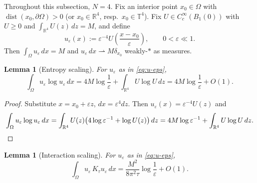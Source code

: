 \documentclass[11pt,reqno]{amsart}
\newtheorem{lemma}[theorem]{Lemma}
\theoremstyle{definition}
\theoremstyle{remark}
\newcommand{\R}{\mathbb{R}}
\newcommand{\T}{\mathbb{T}}
\newcommand{\dist}{\operatorname{dist}}
\begin{document}
Throughout this subsection, $N=4$. Fix an interior point $x_0\in\Omega$ with $\dist(x_0,\partial\Omega)>0$ (or $x_0\in\R^{4}$, resp.\ $x_0\in\T^{4}$). Fix $U\in C_c^{\infty}(B_{1}(0))$ with $U\ge 0$ and $\int_{\R^{4}}U(z)\,dz=M$, and define
\begin{equation}\label{eq:u-eps}
        u_\varepsilon(x):=\varepsilon^{-4}U\!\left(\frac{x-x_0}{\varepsilon}\right),
        \qquad 0<\varepsilon\ll 1.
\end{equation}
Then $\int_\Omega u_\varepsilon\,dx=M$ and $u_\varepsilon\,dx\rightharpoonup M\delta_{x_0}$ weakly-$*$ as measures.

\begin{lemma}[Entropy scaling]\label{lem:entropy-scaling}
For $u_\varepsilon$ as in \eqref{eq:u-eps},
\begin{equation}\label{eq:entropy-scaling}
        \int_\Omega u_\varepsilon\log u_\varepsilon\,dx
        =4M\log\frac{1}{\varepsilon}+\int_{\R^{4}}U\log U\,dz
        =4M\log\frac{1}{\varepsilon}+O(1).
\end{equation}
\end{lemma}

\begin{proof}
Substitute $x=x_0+\varepsilon z$, $dx=\varepsilon^{4}dz$. Then $u_\varepsilon(x)=\varepsilon^{-4}U(z)$ and
\[
        \int_\Omega u_\varepsilon\log u_\varepsilon\,dx
        =\int_{\R^{4}}U(z)\bigl(4\log\varepsilon^{-1}+\log U(z)\bigr)\,dz
        =4M\log\varepsilon^{-1}+\int_{\R^{4}}U\log U\,dz.\qedhere
\]
\end{proof}

\begin{lemma}[Interaction scaling]\label{lem:interaction-scaling}
For $u_\varepsilon$ as in \eqref{eq:u-eps},
\begin{equation}\label{eq:interaction-scaling}
        \int_\Omega u_\varepsilon\,K_\tau u_\varepsilon\,dx
        =\frac{M^{2}}{8\pi^{2}\tau}\log\frac{1}{\varepsilon}+O(1).
\end{equation}
\end{lemma}
\end{document}
